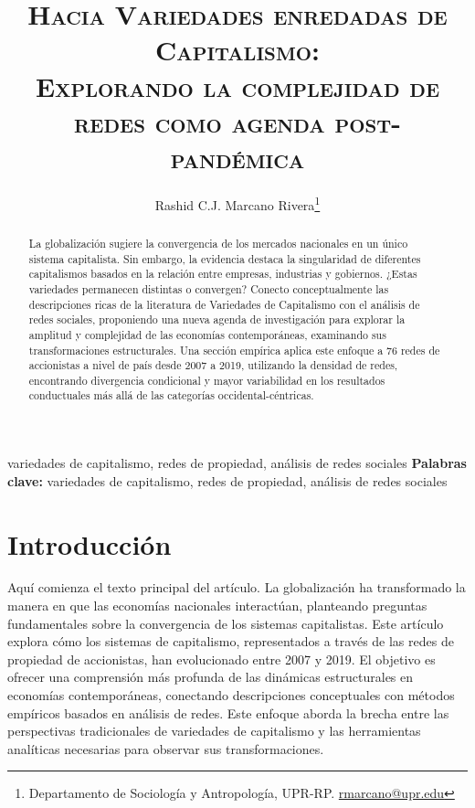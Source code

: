 \documentclass[12pt]{article}
\newcommand{\keywords}[1]{%
  \ifx#1\empty\else
    \vspace{0.5em}
    \noindent\textbf{Palabras clave:} #1
    \par
  \fi
}
\begin{document}
\fontsize{12}{15}\selectfont
\singlespacing

\title{\textsc{Hacia Variedades enredadas de Capitalismo: \\ Explorando la complejidad de redes como agenda post-pandémica}}
\author{
  Rashid C.J. Marcano Rivera\thanks{Departamento de Sociología y Antropología, UPR-RP. \href{mailto:rmarcano@upr.edu}{rmarcano@upr.edu}}}

\date{}
\maketitle

\begin{abstractbox}
\begin{abstract}
\small
La globalización sugiere la convergencia de los mercados nacionales en un único sistema capitalista. Sin embargo, la evidencia destaca la singularidad de diferentes capitalismos basados en la relación entre empresas, industrias y gobiernos. ¿Estas variedades permanecen distintas o convergen? Conecto conceptualmente las descripciones ricas de la literatura de Variedades de Capitalismo con el análisis de redes sociales, proponiendo una nueva agenda de investigación para explorar la amplitud y complejidad de las economías contemporáneas, examinando sus transformaciones estructurales. Una sección empírica aplica este enfoque a 76 redes de accionistas a nivel de país desde 2007 a 2019, utilizando la densidad de redes, encontrando divergencia condicional y mayor variabilidad en los resultados conductuales más allá de las categorías occidental-céntricas.
\end{abstract}\end{abstractbox}

\keywords{variedades de capitalismo, redes de propiedad, análisis de redes sociales}
\medskip
\onehalfspacing
\section{Introducción}
Aquí comienza el texto principal del artículo.  La globalización ha transformado la manera en que las economías nacionales interactúan, planteando preguntas fundamentales sobre la convergencia de los sistemas capitalistas. Este artículo explora cómo los sistemas de capitalismo, representados a través de las redes de propiedad de accionistas, han evolucionado entre 2007 y 2019. El objetivo es ofrecer una comprensión más profunda de las dinámicas estructurales en economías contemporáneas, conectando descripciones conceptuales con métodos empíricos basados en análisis de redes. Este enfoque aborda la brecha entre las perspectivas tradicionales de variedades de capitalismo y las herramientas analíticas necesarias para observar sus transformaciones.
\end{document}

